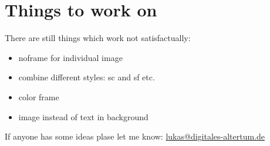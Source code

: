 \documentclass[a4paper,
10pt,
english
]{ltxdoc}
\begin{document}
\section{Things to work on}
There are still things which work not satisfactually:
\begin{itemize}
	\item  noframe for individual image
\item  combine different styles: sc and sf etc.
\item  color frame
\item  image instead of text in background
\end{itemize}
If anyone has some ideas plase let me know: \href{mailto:lukas@digitales-altertum.de}{lukas@digitales-altertum.de}
\end{document}
